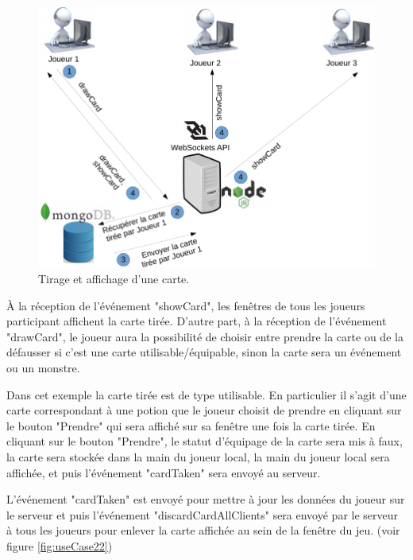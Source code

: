 \documentclass[12pt]{report}
\begin{document}
			\begin{figure}[h!]
		  	\centering
		    \includegraphics[scale=0.5]{images/useCase21.png}
		    \caption{Tirage et affichage d'une carte.}
				\label{fig:useCase21}
		  \end{figure}

			À la réception de l'événement "showCard", les fenêtres de tous les joueurs participant affichent la carte tirée. D'autre part, à la réception de l'événement "drawCard", le joueur aura la possibilité de choisir entre prendre la carte ou de la défausser si c'est une carte utilisable/équipable, sinon la carte sera un événement ou un monstre.

			Dans cet exemple la carte tirée est de type utilisable. En particulier il s'agit d'une carte correspondant à une potion que le joueur choisit de prendre en cliquant sur le bouton "Prendre" qui sera affiché sur sa fenêtre une fois la carte tirée. En cliquant sur le bouton "Prendre", le statut d'équipage de la carte sera mis à faux, la carte sera stockée dans la main du joueur local, la main du joueur local sera affichée, et puis l'événement "cardTaken" sera envoyé au serveur.

			L'événement "cardTaken" est envoyé pour mettre à jour les données du joueur sur le serveur et puis l'événement "discardCardAllClients" sera envoyé par le serveur à tous les joueurs pour enlever la carte affichée au sein de la fenêtre du jeu. (voir figure \ref{fig:useCase22})
\end{document}
